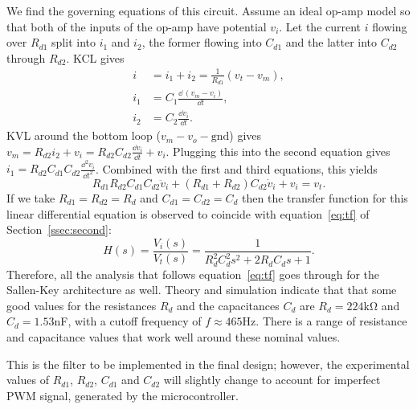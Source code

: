 We find the governing equations of this circuit. Assume an ideal op-amp model so
that both of the inputs of the op-amp have potential $v_i$. Let the current $i$
flowing over $R_{d1}$ split into $i_1$ and $i_2$, the former flowing into
$C_{d1}$ and the latter into $C_{d2}$ through $R_{d2}$. KCL gives
%
\vspace{-1em}
\begin{align*}
    i &= i_1 + i_2 = \frac{1}{R_{d1}}(v_t - v_m), \\
    i_1 &= C_1 \frac{\dd\, (v_m - v_i)}{\dd t}, \\
    i_2 &= C_2 \frac{\dd v_i}{\dd t}.
\end{align*}
%
KVL around the bottom loop ($v_m - v_o - \text{gnd}$) gives $v_m = R_{d2}i_2 +
v_i = R_{d2}C_{d2}\frac{\dd v_i}{\dd t} + v_i$. Plugging this into the second
equation gives $i_1 = R_{d2}C_{d1}C_{d2}\frac{\dd^2v_i}{\dd t^2}$. Combined with
the first and third equations, this yields
%
\begin{equation}
    R_{d1}R_{d2}C_{d1}C_{d2}\ddot{v}_i + (R_{d1} + R_{d2})C_{d2}\dot{v}_i + v_i
    = v_t.
    \label{eq:sallenkey_de}
\end{equation}
%
If we take $R_{d1} = R_{d2} = R_d$ and $C_{d1} = C_{d2} = C_d$ then the transfer
function for this linear differential equation is observed to coincide with
equation~\eqref{eq:tf} of Section~\ref{ssec:second}: \[ H(s) =
\frac{V_i(s)}{V_t(s)} = \frac{1}{R_d^2C_d^2s^2 + 2R_dC_ds + 1}.\]
%
Therefore, all the analysis that follows equation~\eqref{eq:tf} goes through for
the Sallen-Key architecture as well. Theory and simulation indicate that that
some good values for the resistances $R_d$ and the capacitances $C_d$ are $R_d =
224$\unit{\kilo\ohm} and $C_d = 1.53$\unit{\nano\farad}, with a cutoff frequency
of $f \approx 465$\unit{\hertz}. There is a range of resistance and capacitance
values that work well around these nominal values.

\begin{rem}
    This is the filter to be implemented in the final design; however, the
    experimental values of $R_{d1}$, $R_{d2}$, $C_{d1}$ and $C_{d2}$ will
    slightly change to account for imperfect PWM signal, generated by the
    microcontroller.
\end{rem}
